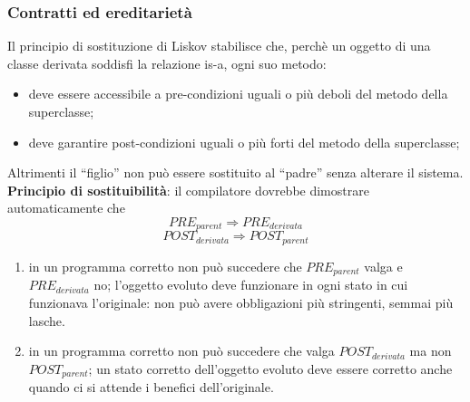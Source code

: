 \subsubsection{Contratti ed ereditarietà}
Il principio di sostituzione di Liskov stabilisce che, perchè un oggetto di una classe derivata soddisfi la relazione is-a, ogni suo metodo:
\begin{itemize}
    \item deve essere accessibile a pre-condizioni uguali o più deboli del metodo della superclasse;
    \item deve garantire post-condizioni uguali o più forti del metodo della superclasse;
\end{itemize}
Altrimenti il “figlio” non può essere sostituito al “padre” senza alterare il sistema.\\

\noindent\textbf{Principio di sostituibilità}: il compilatore dovrebbe dimostrare automaticamente che \[PRE_{parent} \Longrightarrow PRE_{derivata}\]
\[POST_{derivata} \Longrightarrow POST_{parent}\]
\begin{enumerate}
    \item in un programma corretto non può succedere che \(PRE_{parent}\) valga e \(PRE_{derivata}\) no; l’oggetto evoluto deve funzionare in ogni stato in cui funzionava l’originale:  non può avere obbligazioni più stringenti, semmai più lasche.
    \item in un programma corretto non può succedere che valga \(POST_{derivata}\) ma non \(POST_{parent}\); un stato corretto dell’oggetto evoluto deve essere corretto anche quando ci si attende i benefici dell’originale.
\end{enumerate}


